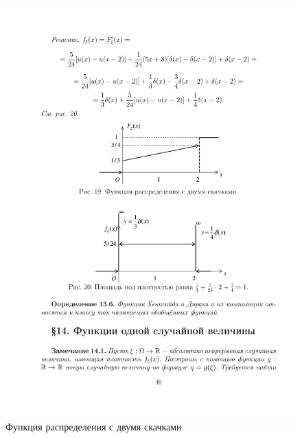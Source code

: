 \begin{figure}[h!]
	\centering
	\includegraphics[]{pic/pic19}
	\caption{Функция распределения с двумя скачками}
	\label{fig19}
\end{figure}
